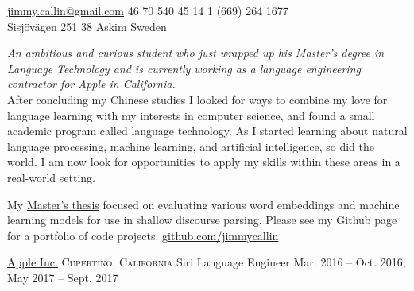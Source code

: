 \documentclass[10pt,a4paper]{article}
\begin{document}
\sloppy  %



\nobreakvspace{0.3em}  %

\noindent\href{mailto:jimmy.callin@gmail.com}{jimmy.callin@gmail.com}\sbull
\textsmaller{+}46 70 540 45 14 \sbull
\textsmaller{+}1 (669) 264 1677
\\
Sisjövägen 251 38\thinspace {\large}\sbull
Askim\sbull
Sweden

\spacedhrule{0.9em}{-0.4em}  %


\vspace{-0.4em}  %
\begin{multicols}{2}  %
\noindent \emph{An ambitious and curious student who just wrapped up his Master's degree in Language Technology and is currently working as a language engineering contractor for Apple in California.}
\\
After concluding my Chinese studies I looked for ways to combine my love for language learning with my interests in computer science, and found a small academic program called language technology. As I started learning about natural language processing, machine learning, and artificial intelligence, so did the world. I am now look for opportunities to apply my skills within these areas in a real-world setting.

My \href{http://stp.lingfil.uu.se/exarb/master/callin2017.pdf}{Master's thesis} focused on evaluating various word embeddings and machine learning models for use in shallow discourse parsing. Please see my Github page for a portfolio of code projects: \href{https://github.com/jimmycallin}{github.com/jimmycallin}
\end{multicols}


\spacedhrule{0em}{-0.4em}


\headedsection  %
  {\href{https://apple.com}{Apple Inc.}}
  {\textsc{Cupertino, California}} {%
  \headedsubsection
    {Siri Language Engineer}
    {Mar. 2016 -- Oct. 2016, May 2017 -- Sept. 2017}
{}
}
\end{document}
